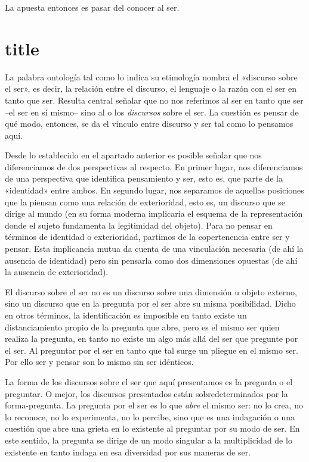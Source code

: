 La apuesta entonces es pasar del conocer al ser.

\section{title}

La palabra ontología tal como lo indica su etimología nombra el «discurso sobre el ser», es decir, la relación entre el discurso, el lenguaje o la razón con el ser en tanto que ser. Resulta central señalar que no nos referimos al ser en tanto que ser --el ser en sí mismo-- sino al o los \emph{discursos} sobre el ser. La cuestión es pensar de qué modo, entonces, se da el vínculo entre discurso y ser tal como lo pensamos aquí.

Desde lo establecido en el apartado anterior es posible señalar que nos diferenciamos de dos perspectivas al respecto. En primer lugar, nos diferenciamos de una perspectiva que identifica pensamiento y ser, esto es, que parte de la «identidad» entre ambos. En segundo lugar, nos separamos de aquellas posiciones que la piensan como una relación de exterioridad, esto es, un discurso que se dirige al mundo (en su forma moderna implicaría el esquema de la representación donde el sujeto fundamenta la legitimidad del objeto). Para no pensar en términos de identidad o exterioridad, partimos de la copertenencia entre ser y pensar. Esta implicancia mutua da cuenta de una vinculación necesaria (de ahí la ausencia de identidad) pero sin pensarla como dos dimensiones opuestas (de ahí la ausencia de exterioridad).

El discurso sobre el ser no es un discurso sobre una dimensión u objeto externo, sino un discurso que en la pregunta por el ser abre su misma posibilidad. Dicho en otros términos, la identificación es imposible en tanto existe un distanciamiento propio de la pregunta que abre, pero es el mismo ser quien realiza la pregunta, en tanto no existe un algo más allá del ser que pregunte por el ser. Al preguntar por el ser en tanto que tal surge un pliegue en el mismo ser. Por ello ser y pensar son lo mismo sin ser idénticos.

La forma de los discursos sobre el ser que aquí presentamos es la pregunta o el preguntar. O mejor, los discursos presentados están sobredeterminados por la forma-pregunta. La pregunta por el ser es lo que \emph{abre} el mismo ser: no lo crea, no lo reconoce, no lo experimenta, no lo percibe, sino que es una indagación o una cuestión que abre una grieta en lo existente al preguntar por su modo de ser. En este sentido, la pregunta se dirige de un modo singular a la multiplicidad de lo existente en tanto indaga en esa diversidad por sus maneras de ser.

